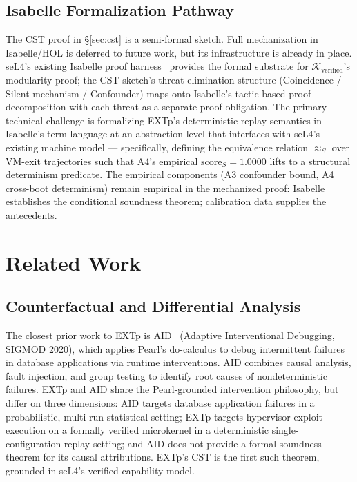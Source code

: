 \documentclass[conference]{IEEEtran}
\newcommand{\Kverified}{\mathcal{K}_\text{verified}}
\newcommand{\scoreS}{\text{score}_S}
\begin{document}
\subsection{Isabelle Formalization Pathway}\label{sec:discussion-isabelle}

The CST proof in \S\ref{sec:cst} is a semi-formal sketch. Full
mechanization in Isabelle/HOL is deferred to future work, but its
infrastructure is already in place. seL4's existing Isabelle proof
harness~\cite{klein2014sel4} provides the formal substrate for
$\Kverified$'s modularity proof; the CST sketch's
threat-elimination structure (Coincidence / Silent mechanism /
Confounder) maps onto Isabelle's tactic-based proof decomposition
with each threat as a separate proof obligation. The primary
technical challenge is formalizing EXTp's deterministic replay
semantics in Isabelle's term language at an abstraction level that
interfaces with seL4's existing machine model --- specifically,
defining the equivalence relation $\approx_S$ over VM-exit
trajectories such that A4's empirical $\scoreS{=}1.0000$ lifts to
a structural determinism predicate. The empirical components (A3
confounder bound, A4 cross-boot determinism) remain empirical in
the mechanized proof: Isabelle establishes the conditional
soundness theorem; calibration data supplies the antecedents.

\section{Related Work}\label{sec:related}

\subsection{Counterfactual and Differential Analysis}

The closest prior work to EXTp is AID~\cite{fariha2020aid} (Adaptive
Interventional Debugging, SIGMOD 2020), which applies Pearl's
do-calculus to debug intermittent failures in database applications
via runtime interventions. AID combines causal analysis, fault
injection, and group testing to identify root causes of
nondeterministic failures. EXTp and AID share the Pearl-grounded
intervention philosophy, but differ on three dimensions: AID targets
database application failures in a probabilistic, multi-run
statistical setting; EXTp targets hypervisor exploit execution on a
formally verified microkernel in a deterministic single-configuration
replay setting; and AID does not provide a formal soundness theorem
for its causal attributions. EXTp's CST is the first such theorem,
grounded in seL4's verified capability model.
\end{document}
